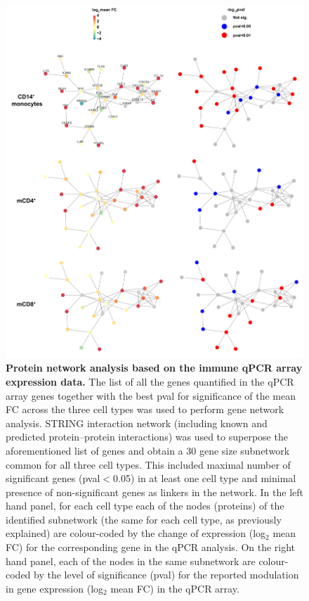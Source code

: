 \begin{figure}[htbp]
\centering
\includegraphics[width=\textwidth]{./Results3/pdfs/PSA_PCR_array_network_analysis}
\caption[Protein network analysis based on the immune qPCR array expression data.]{\textbf{Protein network analysis based on the immune qPCR array expression data.} The list of all the genes quantified in the qPCR array genes together with the best pval for significance of the mean FC across the three cell types was used to perform gene network analysis. STRING interaction network (including known and predicted protein–protein interactions) was used to superpose the aforementioned list of genes and obtain a 30 gene size subnetwork common for all three cell types. This included maximal number of significant genes (pval$<$0.05) in at least one cell type and minimal presence of non-significant genes as linkers in the network. In the left hand panel, for each cell type each of the nodes (proteins) of the identified subnetwork (the same for each cell type, as previously explained) are colour-coded by the change of expression (log${_2}$ mean FC) for the corresponding gene in the qPCR analysis. On the right hand panel, each of the nodes in the same subnetwork are colour-coded by the level of significance (pval) for the reported modulation in gene expression (log${_2}$ mean FC) in the qPCR array.}
\label{figure:PSA_PCR_network_analysis}
\end{figure}



